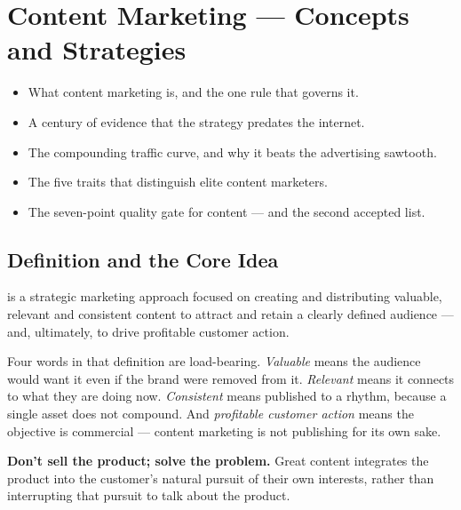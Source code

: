 \documentclass{MMTextbook}
\begin{document}
\chapter{Content Marketing --- Concepts and Strategies}


\begin{learningoutcomes}
\begin{itemize}
\item What content marketing is, and the one rule that governs it.
\item A century of evidence that the strategy predates the internet.
\item The compounding traffic curve, and why it beats the advertising sawtooth.
\item The five traits that distinguish elite content marketers.
\item The seven-point quality gate for content --- and the second accepted list.
\end{itemize}
\end{learningoutcomes}

\section{Definition and the Core Idea}

\begin{definitionbox}
 is a strategic marketing approach focused on
creating and distributing valuable, relevant and consistent content to attract
and retain a clearly defined audience --- and, ultimately, to drive profitable
customer action.
\end{definitionbox}

Four words in that definition are load-bearing. \emph{Valuable} means the
audience would want it even if the brand were removed from it.
\emph{Relevant} means it connects to what they are doing now.
\emph{Consistent} means published to a rhythm, because a single asset does not
compound. And \emph{profitable customer action} means the objective is
commercial --- content marketing is not publishing for its own sake.

\begin{keybox}
\textbf{Don't sell the product; solve the problem.} Great content integrates
the product into the customer's natural pursuit of their own interests, rather
than interrupting that pursuit to talk about the product.
\end{keybox}
\end{document}
